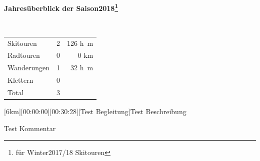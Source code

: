 \begin{center}{\Large \textbf{ Jahres\"uberblick der Saison2018\footnote{f\"ur Winter2017/18  Skitouren}}} 

~

\begin{tabular}{lrr}
Skitouren & 2 & 126 \si{h\meter}\\
Radtouren& 0 & 0 \si{\kilo\meter}\\
Wanderungen& 1 & 32 \si{h\meter}\\
Klettern& 0&\\\hline
Total& 3 &
\end{tabular}\end{center}\newpage 
\begin{minipage}{\textwidth}[6km][00:00:00][00:30:28][Test Begleitung]\label{2018-05-04-Test 2}Test Beschreibung










 Test Kommentar









\end{minipage}

